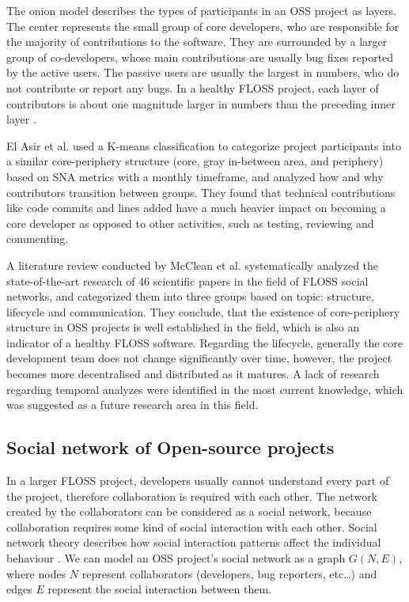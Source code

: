 The onion model describes the types of participants in an OSS project as layers. The center represents the small group of core developers, who are responsible for the majority of contributions to the software. They are surrounded by a larger group of co-developers, whose main contributions are usually bug fixes reported by the active users. The passive users are usually the largest in numbers, who do not contribute or report any bugs. In a healthy FLOSS project, each layer of contributors is about one magnitude larger in numbers than the preceding inner layer \cite{mockusTwoCaseStudies2002}.

El Asir et al. \cite{elasriPeripheryCoreTemporal2017} used a K-means classification to categorize project participants into a similar core-periphery structure (core, gray in-between area, and periphery) based on SNA metrics with a monthly timeframe, and analyzed how and why contributors transition between groups. They found that technical contributions like code commits and lines added have a much heavier impact on becoming a core developer as opposed to other activities, such as testing, reviewing and commenting.

A literature review conducted by McClean et al. \cite{mccleanSocialNetworkAnalysis2021} systematically analyzed the state-of-the-art research of 46 scientific papers in the field of FLOSS social networks, and categorized them into three groups based on topic: structure, lifecycle and communication. They conclude, that the existence of core-periphery structure in OSS projects is well established in the field, which is also an indicator of a healthy FLOSS software. Regarding the lifecycle, generally the core development team does not change significantly over time, however, the project becomes more decentralised and distributed as it matures. A lack of research regarding temporal analyzes were identified in the most current knowledge, which was suggested as a future research area in this field.

\subsection{Social network of Open-source projects}
In a larger FLOSS project, developers usually cannot understand every part of the project, therefore collaboration is required with each other. The network created by the collaborators can be considered as a social network, because collaboration requires some kind of social interaction with each other. Social network theory describes how social interaction patterns affect the individual behaviour \cite{martinez-torresGeneticSearchPatterns2012}. We can model an OSS project's social network as a graph $G(N, E)$, where nodes $N$ represent collaborators (developers, bug reporters, etc\dots) and edges $E$ represent the social interaction between them. 

